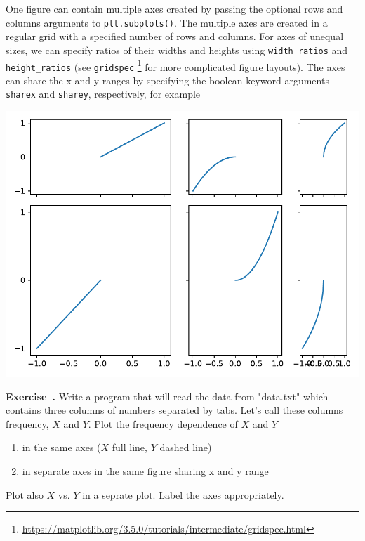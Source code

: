 \documentclass{article}
\newcommand{\ls}[1]{\lstinline{#1}}
\newcounter{exercise}
\newenvironment{exercise}[1][]%
    {\refstepcounter{exercise}%
    \begin{mdframed}[backgroundcolor=exercise,linecolor=white]%
    \textbf{Exercise~\theexercise.} #1 \rmfamily}%
    {\medskip\end{mdframed}}
\begin{document}
One figure can contain multiple axes created by passing the optional rows and columns arguments to \ls{plt.subplots()}. The multiple axes are created in a regular grid with a specified number of rows and columns. For axes of unequal sizes, we can specify ratios of their widths and heights using \ls{width_ratios} and \ls{height_ratios} (see \ls{gridspec} \footnote{\url{https://matplotlib.org/3.5.0/tutorials/intermediate/gridspec.html}} for more complicated figure layouts). The axes can share the x and y ranges by specifying the boolean keyword arguments \ls{sharex} and \ls{sharey}, respectively, for example

\begin{center}
    \includegraphics[width=0.5\linewidth]{multiax.pdf}
\end{center}
\begin{exercise}
    \label{ex:peak}
    Write a program that will read the data from "data.txt" which contains three columns of numbers separated by tabs. Let's call these columns frequency, $X$ and $Y$. Plot the frequency dependence of $X$ and $Y$ 
    \begin{enumerate}
        \item in the same axes ($X$ full line, $Y$ dashed line)
        \item in separate axes in the same figure sharing x and y range
    \end{enumerate}
    Plot also $X$ vs. $Y$ in a seprate plot. Label the axes appropriately.
\end{exercise}
\end{document}
